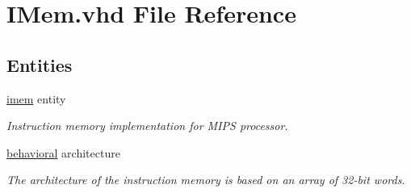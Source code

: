 \hypertarget{_i_mem_8vhd}{\section{\-I\-Mem.\-vhd \-File \-Reference}
\label{_i_mem_8vhd}
}
\subsection*{\-Entities}
\begin{DoxyCompactItemize}
\item 
\hyperlink{classimem}{imem} entity
\begin{DoxyCompactList}\small\item\em \-Instruction memory implementation for \-M\-I\-P\-S processor. \end{DoxyCompactList}\item 
\hyperlink{classimem_1_1behavioral}{behavioral} architecture
\begin{DoxyCompactList}\small\item\em \-The architecture of the instruction memory is based on an array of 32-\/bit words. \end{DoxyCompactList}\end{DoxyCompactItemize}

